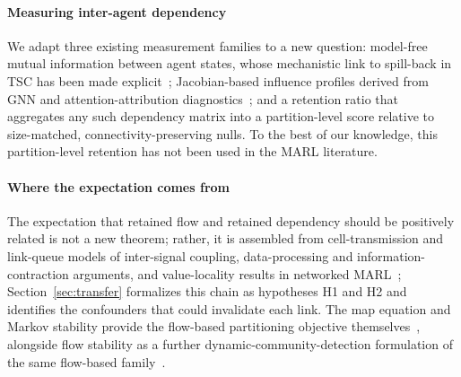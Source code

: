\documentclass[journal]{IEEEtran}
\theoremstyle{definition}
\begin{document}
\paragraph{Measuring inter-agent dependency}
We adapt three existing measurement families to a new question: model-free mutual information between agent states, whose mechanistic link to spill-back in TSC has been made explicit~\citep{dependencydyn2025}; Jacobian-based influence profiles derived from GNN and attention-attribution diagnostics~\citep{lrd2025,abnar2020rollout,simonyan2013saliency,sundararajan2017axiomatic}; and a retention ratio that aggregates any such dependency matrix into a partition-level score relative to size-matched, connectivity-preserving nulls. To the best of our knowledge, this partition-level retention has not been used in the MARL literature.

\paragraph{Where the expectation comes from} The expectation that retained flow and retained dependency should be positively related is not a new theorem; rather, it is assembled from cell-transmission and link-queue models of inter-signal coupling, data-processing and information-contraction arguments, and value-locality results in networked MARL~\citep{daganzo1994ctm,jin2012linkqueue,polyanskiy2017sdpi,evans1999percolation,qu2020average,qu2022scalable,congeduti2021iba}; Section~\ref{sec:transfer} formalizes this chain as hypotheses H1 and H2 and identifies the confounders that could invalidate each link. The map equation and Markov stability provide the flow-based partitioning objective themselves~\citep{rosvall2008maps,rosvall2009mapequation,delvenne2010stability,lambiotte2014multiscale}, alongside flow stability as a further dynamic-community-detection formulation of the same flow-based family~\citep{flowstability2022}.
\end{document}
